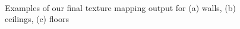 \documentclass[]{spie}  %
\begin{document}
\begin{figure}
  \centering
   ~~~~~~~~
  \\
  \centering

  \centering {}
  \caption{Examples of our final texture mapping output for (a) walls,
    (b) ceilings, (c) floors}
  \label{fig:indivPlanes}
\end{figure}
\end{document}
